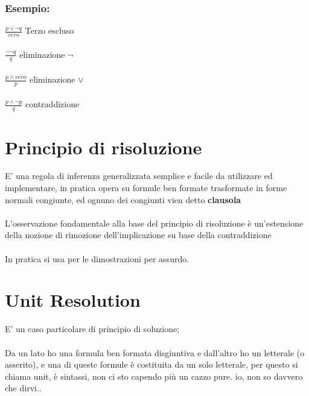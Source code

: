 \documentclass[12pt, a4paper, openany, oneside]{book}
\begin{document}
\subsubsection{Esempio:}
$\frac{p \vee \neg q}{vero} $ Terzo escluso \\ \\
$\frac{\neg \neg q}{q} $ eliminazione $\neg$ \\ \\
$\frac{p \wedge vero}{p} $ eliminazione $\vee$ \\ \\
$\frac{p \wedge \neg p}{q} $ contraddizione
\section{Principio di risoluzione}
E' una regola di inferenza generalizzata semplice e facile da utilizzare ed 
implementare, in pratica opera su formule ben formate trasformate in forme 
normali congiunte, ed ognuno dei congiunti vien detto \textbf{clausola}
\\ \\
L'osservazione fondamentale alla base del principio di risoluzione è un'estensione 
della nozione di rimozione dell'implicazione su base della contraddizione \\ \\
In pratica si usa per le dimostrazioni per assurdo.
\section{Unit Resolution}
E' un caso particolare di principio di soluzione; \\ \\
Da un lato ho una formula ben formata disgiuntiva e dall'altro ho un letterale 
(o asserito), e una di queste formule è costituita da un solo letterale, per 
questo si chiama unit, è sintassi, non ci sto capendo più un cazzo pure. 
io, non so davvero che dirvi.. \\ \\ 
\end{document}

